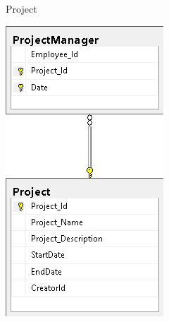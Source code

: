 \begin{frame}{Project}
  \begin{center}
    \includegraphics[height=0.9\textheight]{images/database/Project.png}
  \end{center}
\end{frame}